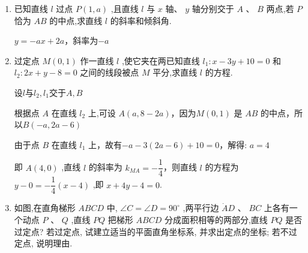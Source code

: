 \begin{enumerate}
\begin{jieda}
\begin{enumerate}
            结合对勾函数性质可知四根必定不重复，所以等价于${k}^{2} + \left( {{2m} - 8}\right) k + {16} = 0$ 有两个不等实根且 ${k}^{2} - \left( {{2m} + 8}\right) k + {16} = 0$ 有两个不等实根,
            
            $\left\{  \begin{array}{l} {\Delta }_{1} = {\left( 2m - 8\right) }^{2} - {64} > 0 \\  {\Delta }_{2} = {\left( 2m + 8\right) }^{2} - {64} > 0 \end{array}\right.$ ,解得 $m <  - 8$ 或 $m > 8$ .
            
            又 $m > 0$ ,所以 $m > 8$ .
        \end{enumerate}
        
    \end{jieda}
    
    \item 已知直线 $l$ 过点 $P\left( {1,a}\right)$ ,且直线 $l$ 与 $x$ 轴、 $y$ 轴分别交于 $A\text{ 、 }B$ 两点,若 $P$ 恰为 ${AB}$ 的中点,求直线 $l$ 的斜率和倾斜角.
    \begin{jieda}
        $y = -ax+2a$，斜率为$-a$
    \end{jieda}
    
    \item 过定点 $M\left( {0,1}\right)$ 作一直线 $l$ ,使它夹在两已知直线 ${l}_{1} : x - {3y} + {10} = 0$ 和 ${l}_{2} : {2x} + y - 8 = 0$ 之间的线段被点 $M$ 平分,求直线 $l$ 的方程.
    \begin{jieda}
        设$l$与$l_2, l_1$交于$A,B$
    
        根据点 $A$ 在直线 ${l}_{2}$ 上,可设 $A\left( {a,8 - {2a}}\right)$，因为$M\left( {0,1}\right)$ 是 ${AB}$ 的中点，所以$B\left( {-a,{2a} - 6}\right)$ 
        
        由于点 $B$ 在直线 ${l}_{1}$ 上，故有$- a - 3\left( {{2a} - 6}\right)  + {10} = 0$，解得: $a = 4$
        
        即 $A\left( {4,0}\right)$ ,直线 $l$ 的斜率为 ${k}_{MA} =  - \dfrac{1}{4}$，则直线 $l$ 的方程为 $y - 0 =  - \dfrac{1}{4}\left( {x - 4}\right)$ ,即 $x + {4y} - 4 = 0$.
    \end{jieda}
    
    \item 如图,在直角梯形 ${ABCD}$ 中, $\angle C = \angle D = {90}^{ \circ  }$ ,两平行边 $\dot{A}D$ 、 ${BC}$ 上各有一个动点 $P$ 、 $Q$ ,直线 ${PQ}$ 把梯形 ${ABCD}$ 分成面积相等的两部分,直线 ${PQ}$ 是否过定点? 若过定点, 试建立适当的平面直角坐标系, 并求出定点的坐标; 若不过定点, 说明理由.
    

\end{enumerate}
